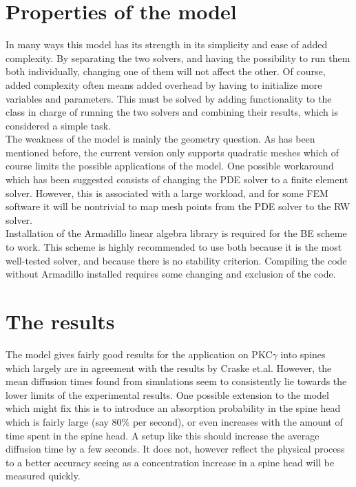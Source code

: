 \section{Properties of the model}

In many ways this model has its strength in its simplicity and ease of added complexity. 
By separating the two solvers, and having the possibility to run them both individually, changing one of them will not affect the other. 
Of course, added complexity often means added overhead by having to initialize more variables and parameters. 
This must be solved by adding functionality to the class in charge of running the two solvers and combining their results, which is considered a simple task. \\

The weakness of the model is mainly the geometry question. 
As has been mentioned before, the current version only supports quadratic meshes which of course limits the possible applications of the model. 
One possible workaround which has been suggested consists of changing the PDE solver to a finite element solver. 
However, this is associated with a large workload, and for some FEM software it will be nontrivial to map mesh points from the PDE solver to the RW solver.\\

Installation of the Armadillo linear algebra library is required for the BE scheme to work. 
This scheme is highly recommended to use both because it is the most well-tested solver, and because there is no stability criterion. 
Compiling the code without Armadillo installed requires some changing and exclusion of the code.

\section{The results}\label{discussion:results}

The model gives fairly good results for the application on PKC$\gamma$ into spines which largely are in agreement with the results by Craske et.al. 
However, the mean diffusion times found from simulations seem to consistently lie towards the lower limits of the experimental results. 
One possible extension to the model which might fix this is to introduce an absorption probability in the spine head which is fairly large (say 80\% per second), or even increases with the amount of time spent in the spine head. 
A setup like this should increase the average diffusion time by a few seconds. 
It does not, however reflect the physical process to a better accuracy seeing as a concentration increase in a spine head will be measured quickly.